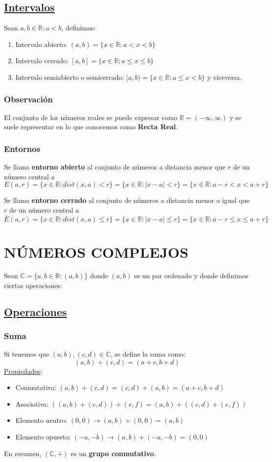 \documentclass[10pt,a4paper,openright]{book}
\begin{document}
\subsection*{\underline{Intervalos}}
Sean $a,b\in \mathbb R: a<b$, definimos:
\begin{enumerate}
\item Intervalo abierto: $(a,b)=\{x\in \mathbb R: a<x<b\}$
\item Intervalo cerrado: $[a,b]=\{x\in \mathbb R: a\leq x\leq b\}$
\item Intervalo semiabierto o semicerrado: $[a,b)=\{x\in \mathbb R: a\leq x<b\}$ y viceversa.
\end{enumerate}

\subsubsection*{Observación}
El conjunto de los números reales se puede expresar como $\mathbb R=(-\infty,\infty)$ y se suele representar en lo que conocemos como \textbf{Recta Real}.

\subsubsection*{Entornos}
Se llama \textbf{entorno abierto} al conjunto de números a distancia menor que $r$ de un número central $a$
$$E(a,r)=\{x\in \mathbb R : dist(x,a)<r\}=\{x\in \mathbb R :|x-a|<r\}=\{x\in \mathbb R :a-r<x<a+r\}$$

Se llama \textbf{entorno cerrado} al conjunto de números a distancia menor o igual que $r$ de un número central $a$
$$\bar{E}(a,r)=\{x\in \mathbb R : dist(x,a)\leq r\}=\{x\in \mathbb R :|x-a|\leq r\}=\{x\in \mathbb R :a-r\leq x\leq a+r\}$$

\section*{NÚMEROS COMPLEJOS}
Sean $\mathbb C=\{a,b\in \mathbb R: (a,b)\}$ donde $(a,b)$ es un par ordenado y donde definimos ciertas operaciones:
\subsection*{\underline{Operaciones}}
\subsubsection*{Suma}
Si tenemos que $(a,b),(c,d)\in \mathbb C$, se define la suma como:
$$(a,b)+(c,d)=(a+c,b+d)$$
\underline{Propiedades}:
\begin{itemize}
\item Conmutativa: $(a,b)+(c,d)=(c,d)+(a,b)=(a+c,b+d)$
\item Asociativa: $\left((a,b)+(c,d)\right)+(e,f)=(a,b)+\left((c,d)+(e,f)\right)$
\item Elemento neutro: $(0,0)\rightarrow (a,b)+(0,0)=(a,b)$
\item Elemento opuesto: $(-a,-b)\rightarrow (a,b)+(-a,-b)=(0,0)$
\end{itemize}
En resumen, $(\mathbb C, +)$ es un \textbf{grupo conmutativo}.
\end{document}

